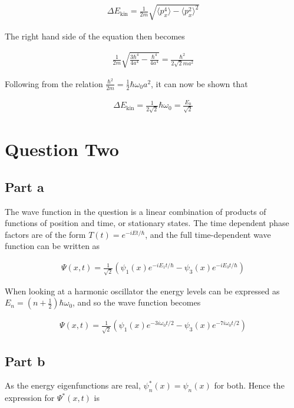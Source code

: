 \documentclass[paper=a4, fontsize=11pt]{scrartcl} %
\numberwithin{equation}{section} %
\numberwithin{figure}{section} %
\numberwithin{table}{section} %
\begin{document}
\begin{align}
\Delta E_{\textrm{kin}} = \frac{1}{2m}\sqrt{\langle p^4_x \rangle - \langle p^2_x \rangle^2}
\end{align}

The right hand side of the equation then becomes

\begin{align}
\frac{1}{2m} \sqrt{\frac{3\hbar^4}{4a^4} - \frac{\hbar^4}{4a^4}}
= \frac{\hbar^2}{2\sqrt{2}ma^2}
\end{align}

Following from the relation $\frac{\hbar^2}{2m} = \frac{1}{2} \hbar \omega_0 a^2$, it can now be shown that

\begin{align}
\Delta E_{\textrm{kin}} = \frac{1}{2\sqrt{2}}\hbar \omega_0
= \frac{E_0}{\sqrt{2}}
\end{align}

\section{Question Two}
\subsection{Part a}
The wave function in the question is a linear combination of products of functions of position and time, or stationary states. The time dependent phase factors are of the form $T(t) = e^{-iEt/\hbar}$, and the full time-dependent wave function can be written as


\begin{align}
\Psi(x,t) = \frac{1}{\sqrt{2}}
\left(\psi_1(x)e^{-iE_1t/\hbar} - \psi_3(x)e^{-iE_3t/\hbar}\right)
\end{align}

When looking at a harmonic oscillator the energy levels can be expressed as $E_n = (n+\frac{1}{2})\hbar \omega_0$,
and so the wave function becomes

\begin{align}
\Psi(x,t) = \frac{1}{\sqrt{2}}
\left(\psi_1(x)e^{-3i\omega_0t/2} - \psi_3(x)e^{-7i\omega_0t/2}\right)
\end{align}

\subsection{Part b}
As the energy eigenfunctions are real, $\psi^*_n(x) = \psi_n(x)$ for both. Hence the expression for $\Psi^*(x,t)$ is
\end{document}
